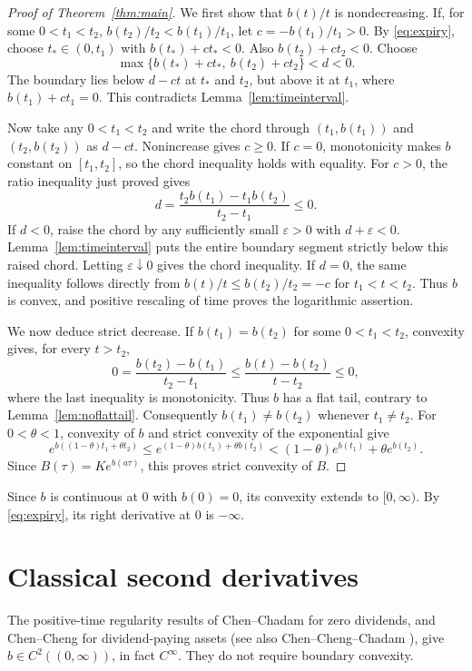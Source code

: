 \documentclass[11pt]{article}
\begin{document}
\begin{proof}[Proof of Theorem~\ref{thm:main}]
We first show that $b(t)/t$ is nondecreasing. If, for some $0<t_1<t_2$,
$b(t_2)/t_2<b(t_1)/t_1$, let $c=-b(t_1)/t_1>0$.
By \eqref{eq:expiry}, choose $t_*\in(0,t_1)$ with
$b(t_*)+ct_*<0$. Also $b(t_2)+ct_2<0$.
Choose
\[
  \max\{b(t_*)+ct_*,\ b(t_2)+ct_2\}<d<0.
\]
The boundary lies below $d-ct$ at $t_*$ and $t_2$, but above it at
$t_1$, where $b(t_1)+ct_1=0$. This contradicts
Lemma~\ref{lem:timeinterval}.

Now take any $0<t_1<t_2$ and write the chord through $(t_1,b(t_1))$ and
$(t_2,b(t_2))$ as $d-ct$. Nonincrease gives $c\ge0$.
If $c=0$, monotonicity makes $b$ constant on $[t_1,t_2]$, so the
chord inequality holds with equality. For $c>0$, the ratio
inequality just proved gives
\[
  d=\frac{t_2 b(t_1)-t_1 b(t_2)}{t_2-t_1}\le0.
\]
If $d<0$, raise the chord by any sufficiently small
$\varepsilon>0$ with $d+\varepsilon<0$.
Lemma~\ref{lem:timeinterval} puts the entire boundary segment
strictly below this raised chord. Letting $\varepsilon\downarrow0$
gives the chord inequality. If $d=0$, the same inequality follows
directly from $b(t)/t\le b(t_2)/t_2=-c$ for $t_1<t<t_2$.
Thus $b$ is convex, and positive rescaling of time proves the
logarithmic assertion.

We now deduce strict decrease. If $b(t_1)=b(t_2)$ for some $0<t_1<t_2$,
convexity gives, for every $t>t_2$,
\[
  0=\frac{b(t_2)-b(t_1)}{t_2-t_1}\le\frac{b(t)-b(t_2)}{t-t_2}\le0,
\]
where the last inequality is monotonicity. Thus $b$ has a flat
tail, contrary to Lemma~\ref{lem:noflattail}.
Consequently $b(t_1)\ne b(t_2)$ whenever $t_1\ne t_2$.
For $0<\theta<1$, convexity of $b$ and strict convexity of the
exponential give
\[
  e^{b((1-\theta)t_1+\theta t_2)}
    \le e^{(1-\theta)b(t_1)+\theta b(t_2)}
    <(1-\theta)e^{b(t_1)}+\theta e^{b(t_2)}.
\]
Since $B(\tau)=Ke^{b(a\tau)}$, this proves strict convexity of $B$.
\end{proof}

Since $b$ is continuous at $0$ with $b(0)=0$, its convexity extends
to $[0,\infty)$. By \eqref{eq:expiry}, its right derivative at $0$
is $-\infty$.

\section{Classical second derivatives}\label{sec:classical}

The positive-time regularity results of Chen--Chadam
\cite[Remark~2.2 and subsequent regularity analysis]{CC2007} for zero
dividends, and Chen--Cheng \cite{ChenCheng2012} for dividend-paying assets
(see also Chen--Cheng--Chadam \cite[Theorem~1 and \S3]{CCC2013}),
give $b\in C^2((0,\infty))$, in fact
$C^\infty$. They do not require boundary convexity.
\end{document}
